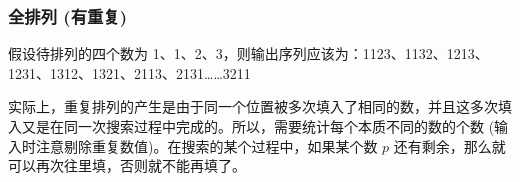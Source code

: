 \subsubsection{全排列 (有重复)}
	假设待排列的四个数为 1、1、2、3，则输出序列应该为：1123、1132、1213、1231、1312、1321、2113、2131……{}3211
	
	实际上，重复排列的产生是由于同一个位置被多次填入了相同的数，并且这多次填入又是在同一次搜索过程中完成的。所以，需要统计每个本质不同的数的个数 (输入时注意剔除重复数值)。在搜索的某个过程中，如果某个数 $p$ 还有剩余，那么就可以再次往里填，否则就不能再填了。
	
	
	
